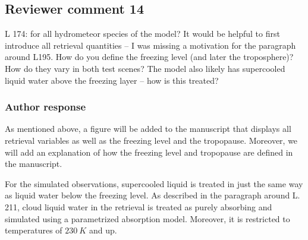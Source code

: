 \documentclass[11pt]{scrartcl}
\begin{document}

%

\subsection*{Reviewer comment 14}

L 174: for all hydrometeor species of the model? It would be helpful to first
introduce all retrieval quantities – I was missing a motivation for the
paragraph around L195. How do you define the freezing level (and later the
troposphere)? How do they vary in both test scenes? The model also likely has
supercooled liquid water above the freezing layer – how is this treated?

\subsubsection*{Author response}

As mentioned above, a figure will be added to the manuscript that displays all
retrieval variables as well as the freezing level and the tropopause. Moreover,
we will add an explanation of how the freezing level and tropopause are defined
in the manuscript.

For the simulated observations, supercooled liquid is treated in just the same
way as liquid water below the freezing level. As described in the paragraph
around L. 211, cloud liquid water in the retrieval is treated as purely
absorbing and simulated using a parametrized absorption model. Moreover, it is
restricted to temperatures of $230\ \unit{K}$ and up.
\end{document}

